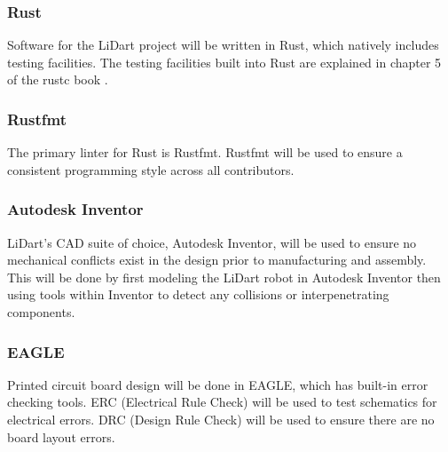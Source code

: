 \documentclass[12pt, titlepage]{article}
\begin{document}



\subsubsection{Rust}
Software for the LiDart project will be written in Rust, which natively includes testing facilities.
The testing facilities built into Rust are explained in chapter 5 of the
rustc book \cite{rust}.

\subsubsection{Rustfmt}
The primary linter for Rust is Rustfmt. Rustfmt will be used to ensure a consistent
programming style across all contributors.

\subsubsection{Autodesk Inventor}
LiDart's CAD suite of choice, Autodesk Inventor, will be used to ensure no mechanical conflicts
exist in the design prior to manufacturing and assembly. This will be done by first modeling the LiDart
robot in Autodesk Inventor then using tools within Inventor to detect any
collisions or interpenetrating components.

\subsubsection{EAGLE}
Printed circuit board design will be done in EAGLE, which has built-in error checking tools. ERC (Electrical Rule Check) will be used to test schematics for electrical errors. DRC (Design Rule Check) will be used to ensure there are no board layout errors.
\end{document}
